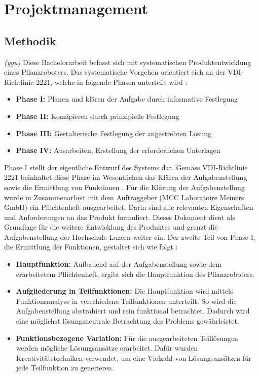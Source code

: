 \newpage
\section{Projektmanagement}
\subsection{Methodik}
\label{methodik}
\textit{(ygu)} Diese Bachelorarbeit befasst sich mit systematischen Produktentwicklung eines Pflanzroboters. Das systematische Vorgehen orientiert sich  an der VDI-Richtlinie 2221, welche in folgende Phasen unterteilt wird \cite{naefe}:

\begin{itemize}
	\item \textbf{Phase I:} Planen und klären der Aufgabe durch informative Festlegung
	
	\item \textbf{Phase II:} Konzipieren durch prinzipielle Festlegung
	
	\item \textbf{Phase III:} Gestalterische Festlegung der angestrebten Lösung
	
	\item \textbf{Phase IV:} Ausarbeiten, Erstellung der erforderlichen Unterlagen
	
\end{itemize}

Phase I stellt der eigentliche Entwurf des Systems dar. Gemäss VDI-Richtlinie 2221 beinhaltet diese Phase im Wesentlichen das Klären der Aufgabenstellung sowie die Ermittlung von Funktionen \cite{vdi2221}. Für die Klärung der Aufgabenstellung wurde in Zusammenarbeit mit dem Auftraggeber (MCC Laboratoire Meiners GmbH) ein Pflichtenheft ausgearbeitet. Darin sind alle relevanten Eigenschaften und Anforderungen an das Produkt formuliert. Dieses Dokument dient als Grundlage für die weitere Entwicklung des Produktes und grenzt die Aufgabenstellung der Hochschule Luzern weiter ein. Der zweite Teil von Phase I, die Ermittlung der Funktionen, gestaltet sich wie folgt \cite{pahl}:

\begin{itemize}
	\item \textbf{Hauptfunktion:} Aufbauend auf der Aufgabenstellung sowie dem erarbeitetem Pflichtenheft, ergibt sich die Hauptfunktion des Pflanzroboters.
	
	\item \textbf{Aufgliederung in Teilfunktionen:} Die Hauptfunktion wird mittels Funktionsanalyse in verschiedene Teilfunktionen unterteilt. So wird die Aufgabenstellung abstrahiert und rein funktional betrachtet. Dadurch wird eine möglichst lösungsneutrale Betrachtung des Problems gewährleistet. 
	
	\item \textbf{Funktionsbezogene Variation:} Für die ausgearbeiteten Teillösungen werden mögliche Lösungsansätze erarbeitet. Dafür wurden Kreativitätstechniken verwendet, um eine Vielzahl von Lösungsansätzen für jede Teilfunktion zu generieren.

\end{itemize}

